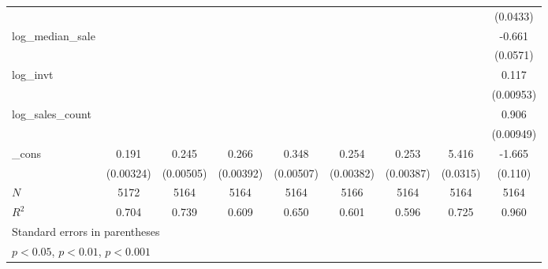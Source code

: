 {\begin{tabular}{l*{8}{c}}
            &                     &                     &                     &                     &                     &                     &                     &    (0.0433)         \\
[1em]
log\_median\_sale&                     &                     &                     &                     &                     &                     &                     &      -0.661\sym{***}\\
            &                     &                     &                     &                     &                     &                     &                     &    (0.0571)         \\
[1em]
log\_invt    &                     &                     &                     &                     &                     &                     &                     &       0.117\sym{***}\\
            &                     &                     &                     &                     &                     &                     &                     &   (0.00953)         \\
[1em]
log\_sales\_count&                     &                     &                     &                     &                     &                     &                     &       0.906\sym{***}\\
            &                     &                     &                     &                     &                     &                     &                     &   (0.00949)         \\
[1em]
\_cons      &       0.191\sym{***}&       0.245\sym{***}&       0.266\sym{***}&       0.348\sym{***}&       0.254\sym{***}&       0.253\sym{***}&       5.416\sym{***}&      -1.665\sym{***}\\
            &   (0.00324)         &   (0.00505)         &   (0.00392)         &   (0.00507)         &   (0.00382)         &   (0.00387)         &    (0.0315)         &     (0.110)         \\
\hline
\(N\)       &        5172         &        5164         &        5164         &        5164         &        5166         &        5164         &        5164         &        5164         \\
\(R^{2}\)   &       0.704         &       0.739         &       0.609         &       0.650         &       0.601         &       0.596         &       0.725         &       0.960         \\
\hline\hline
\multicolumn{9}{l}{\footnotesize Standard errors in parentheses}\\
\multicolumn{9}{l}{\footnotesize \sym{*} \(p<0.05\), \sym{**} \(p<0.01\), \sym{***} \(p<0.001\)}\\
\end{tabular}
}
